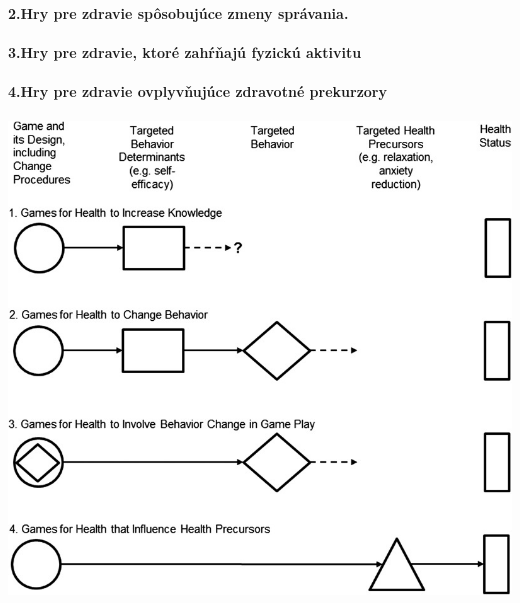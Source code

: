 \documentclass[10pt,twoside,slovak,a4paper]{coursepaper}
\begin{document}
\paragraph{2.Hry pre zdravie spôsobujúce zmeny správania.}
\paragraph{3.Hry pre zdravie, ktoré zahŕňajú fyzickú aktivitu}
\paragraph{4.Hry pre zdravie ovplyvňujúce zdravotné prekurzory}
\paragraph{\includegraphics[scale=2]{tps_1.jpeg}}
\end{document}
